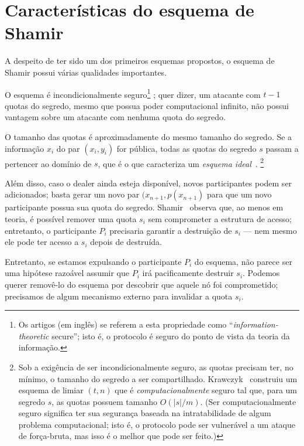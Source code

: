 \documentclass[10pt,twocolumn]{article}
\theoremstyle{definition}
\begin{document}
\section{Características do esquema de Shamir}

A despeito de ter sido um dos primeiros esquemas propostos,
o esquema de Shamir possui várias qualidades importantes.

O esquema é incondicionalmente seguro\footnote{
    Os artigos (em inglês)
    se referem a esta propriedade como
    ``\emph{information-theoretic} secure'';
    isto é,
    o protocolo é seguro do ponto de vista da teoria da informação.
}
\cite{Krawczyk1993};
quer dizer,
um atacante com $t-1$ quotas do segredo,
mesmo que possua poder computacional infinito,
não possui vantagem sobre um atacante com nenhuma quota do segredo.

O tamanho das quotas é aproximadamente do mesmo tamanho do segredo.
Se a informação $x_i$ do par $(x_i, y_i)$ for pública,
todas as quotas do segredo $s$ passam a pertencer ao domínio de $s$,
que é o que caracteriza um \emph{esquema ideal}~\cite{Brickell1990}.
\footnote{
    Sob a exigência de ser incondicionalmente seguro,
    as quotas precisam ter, no mínimo,
    o tamanho do segredo a ser compartilhado.
    Krawczyk~\cite{Krawczyk1993} construiu um esquema de limiar $(t, n)$
    que é \emph{computacionalmente} seguro
    tal que, para um segredo $s$,
    as quotas possuem tamanho $O(|s|/m)$.
    (Ser computacionalmente seguro
    significa ter sua segurança
    baseada na intratabilidade de algum problema computacional;
    isto é,
    o protocolo pode ser vulnerável a um ataque de força-bruta,
    mas isso é o melhor que pode ser feito.)
}

Além disso,
caso o dealer ainda esteja disponível,
novos participantes podem ser adicionados;
basta gerar um novo par $(x_{n+1}, p(x_{n+1})$
para que um novo participante possua sua quota do segredo.
Shamir~\cite{Shamir1979} observa que,
ao menos em teoria,
é possível remover uma quota $s_i$ sem comprometer a estrutura de acesso;
entretanto,
o participante $P_i$ precisaria garantir a destruição de $s_i$
--- nem mesmo ele pode ter acesso a $s_i$ depois de destruída.

Entretanto,
se estamos expulsando o participante $P_i$ do esquema,
não parece ser uma hipótese razoável
assumir que $P_i$ irá pacificamente destruir $s_i$.
Podemos querer removê-lo do esquema
por descobrir que aquele nó foi comprometido;
precisamos de algum mecanismo externo para invalidar a quota $s_i$.
\end{document}
